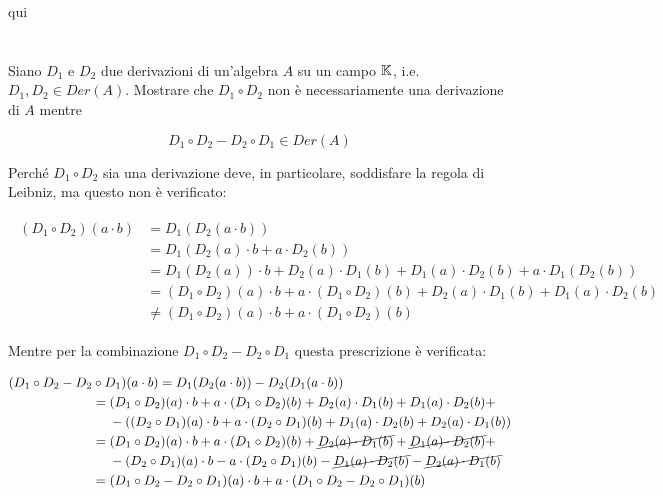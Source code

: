 qui

\tocless\section{}\label{es1-11}

\begin{tcolorbox}
	Siano $ D_{1} $ e $ D_{2} $ due derivazioni di un'algebra $ A $ su un campo $ \mathbb{K} $, i.e. $ D_{1},D_{2} \in Der(A) $. Mostrare che $ D_{1} \circ D_{2} $ non è necessariamente una derivazione di $ A $ mentre
	
	\begin{equation}
		D_{1} \circ D_{2} - D_{2} \circ D_{1} \in Der(A)
	\end{equation}
\end{tcolorbox}

Perché $ D_{1} \circ D_{2} $ sia una derivazione deve, in particolare, soddisfare la regola di Leibniz, ma questo non è verificato:

\begin{align}
	\begin{split}
		(D_{1} \circ D_{2})(a \cdot b) &= D_{1}(D_{2}(a \cdot b))\\
		&= D_{1}( D_{2}(a) \cdot b + a \cdot D_{2}(b) )\\
		&= D_{1}(D_{2}(a)) \cdot b + D_{2}(a) \cdot D_{1}(b) + D_{1}(a) \cdot D_{2}(b) + a \cdot D_{1}(D_{2}(b))\\
		&= (D_{1} \circ D_{2})(a) \cdot b + a \cdot (D_{1} \circ D_{2})(b) + D_{2}(a) \cdot D_{1}(b) + D_{1}(a) \cdot D_{2}(b)\\
		&\neq (D_{1} \circ D_{2})(a) \cdot b + a \cdot (D_{1} \circ D_{2})(b)
	\end{split}
\end{align}

Mentre per la combinazione $ D_{1} \circ D_{2} - D_{2} \circ D_{1} $ questa prescrizione è verificata:

\begin{align}
	\begin{split}
		(D_{1} \circ D_{2} - D_{2} &\circ D_{1})(a \cdot b) = D_{1}(D_{2}(a \cdot b)) - D_{2}(D_{1}(a \cdot b))\\
		&= (D_{1} \circ D_{2})(a) \cdot b + a \cdot (D_{1} \circ D_{2})(b) + D_{2}(a) \cdot D_{1}(b) + D_{1}(a) \cdot D_{2}(b) +\\
		& \hspace{13px} - ((D_{2} \circ D_{1})(a) \cdot b + a \cdot (D_{2} \circ D_{1})(b) + D_{1}(a) \cdot D_{2}(b) + D_{2}(a) \cdot D_{1}(b))\\
		&= (D_{1} \circ D_{2})(a) \cdot b + a \cdot (D_{1} \circ D_{2})(b) + \cancel{ D_{2}(a) \cdot D_{1}(b) } + \cancel{ D_{1}(a) \cdot D_{2}(b) } +\\
		& \hspace{13px} - (D_{2} \circ D_{1})(a) \cdot b - a \cdot (D_{2} \circ D_{1})(b) - \cancel{ D_{1}(a) \cdot D_{2}(b) } - \cancel{ D_{2}(a) \cdot D_{1}(b) }\\
		&= (D_{1} \circ D_{2} - D_{2} \circ D_{1})(a) \cdot b + a \cdot (D_{1} \circ D_{2} - D_{2} \circ D_{1})(b)
	\end{split}
\end{align}

